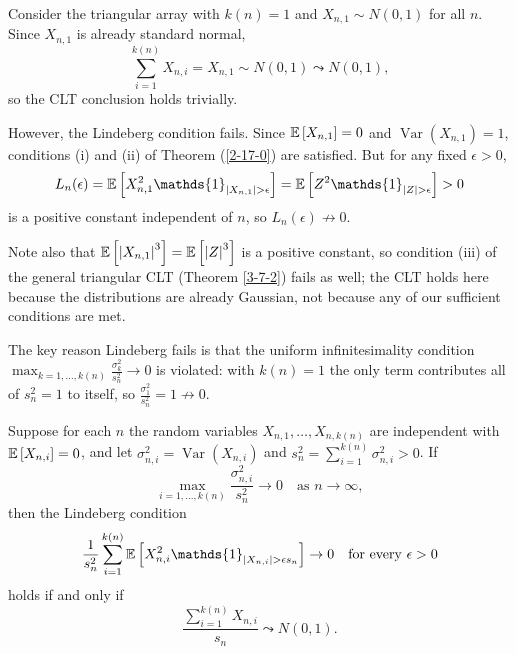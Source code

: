 \begin{example} \label{3-12-2}
	Consider the triangular array with $k(n) = 1$ and $X_{n,1} \sim N(0,1)$ for all $n$. Since $X_{n,1}$ is already standard normal, \[
		\sum_{i=1}^{k(n)} X_{n,i} = X_{n,1} \sim N(0,1) \leadsto N(0,1)
	,\] so the CLT conclusion holds trivially.

	However, the Lindeberg condition fails. Since $\mathbb{E}\left[X_{n,1}\right] = 0$ and $\operatorname{Var}\left(X_{n,1}\right) = 1$, conditions (i) and (ii) of Theorem (\ref{2-17-0}) are satisfied. But for any fixed $\epsilon > 0$, \[
		L_n(\epsilon) = \E\left[X_{n,1}^2 \mathds{1}_{\left|X_{n,1}\right|>\epsilon}\right] = \E\left[Z^2 \mathds{1}_{\left|Z\right|>\epsilon}\right] > 0
	\] is a positive constant independent of $n$, so $L_n(\epsilon) \not\to 0$.

	Note also that $\mathbb{E}\left[\left|X_{n,1}\right|^3\right] = \mathbb{E}\left[\left|Z\right|^3\right]$ is a positive constant, so condition (iii) of the general triangular CLT (Theorem \ref{3-7-2}) fails as well; the CLT holds here because the distributions are already Gaussian, not because any of our sufficient conditions are met.

	The key reason Lindeberg fails is that the uniform infinitesimality condition $\max_{k=1,\ldots,k(n)} \frac{\sigma_k^2}{s_n^2} \to 0$ is violated: with $k(n)=1$ the only term contributes all of $s_n^2 = 1$ to itself, so $\frac{\sigma_1^2}{s_n^2} = 1 \not\to 0$.
\end{example}


\begin{theorem} \label{3-12-1}
	\label{lindeberg-necessity}
	Suppose for each $n$ the random variables $X_{n,1},\ldots,X_{n,k(n)}$ are independent with $\mathbb{E}\left[X_{n,i}\right] = 0$, and let $\sigma_{n,i}^2 = \operatorname{Var}(X_{n,i})$ and $s_n^2 = \sum_{i=1}^{k(n)} \sigma_{n,i}^2 > 0$. If
	\[
		\max_{i=1,\ldots,k(n)} \frac{\sigma_{n,i}^2}{s_n^2} \to 0 \quad \text{as } n \to \infty
	,\]
	then the Lindeberg condition
	\[
		\frac{1}{s_n^2}\sum_{i=1}^{k(n)} \E\left[X_{n,i}^2 \mathds{1}_{\left|X_{n,i}\right| > \epsilon s_n}\right] \to 0 \quad \text{for every } \epsilon > 0
	\]
	holds if and only if
	\[
		\frac{\sum_{i=1}^{k(n)} X_{n,i}}{s_n} \leadsto N(0,1).
	\]
\end{theorem}

